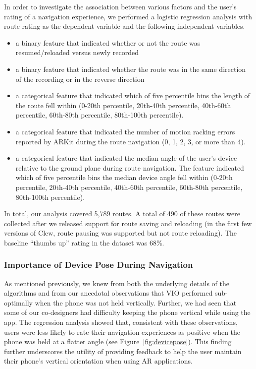 \documentclass[chi_draft]{sigchi}
\begin{document}
In order to investigate the association between various factors and the user's rating of a navigation experience, we performed a logistic regression analysis with route rating as the dependent variable and the following independent variables.
\begin{itemize}
\item a binary feature that indicated whether or not the route was resumed/reloaded versus newly recorded
\item a binary feature that indicated whether the route was in the same direction of the recording or in the reverse direction
\item a categorical feature that indicated which of five percentile bins the length of the route fell within (0-20th percentile, 20th-40th percentile, 40th-60th percentile, 60th-80th percentile, 80th-100th percentile).
\item a categorical feature that indicated the number of motion racking errors reported by ARKit during the route navigation (0, 1, 2, 3, or more than 4).
\item a categorical feature that indicated the median angle of the user's device relative to the ground plane during route navigation.  The feature indicated which of five percentile bins the median device angle fell within (0-20th percentile, 20th-40th percentile, 40th-60th percentile, 60th-80th percentile, 80th-100th percentile).
\end{itemize}

In total, our analysis covered 5,789 routes.  A total of 490 of these routes were collected after we released support for route saving and reloading (in the first few versions of Clew, route pausing was supported but not route reloading).  The baseline ``thumbs up'' rating in the dataset was 68\%. 

\subsubsection{Importance of Device Pose During Navigation}


As mentioned previously, we knew from both the underlying details of the algorithms and from our anecdotal observations that VIO performed sub-optimally when the phone was not held vertically.  Further, we had seen that some of our co-designers had difficulty keeping the phone vertical while using the app. The regression analysis showed that, consistent with these observations, users were less likely to rate their navigation experiences as positive when the phone was held at a flatter angle (see Figure~\ref{fig:devicepose}).  This finding further underscores the utility of providing feedback to help the user maintain their phone's vertical orientation when using AR applications.
\end{document}
